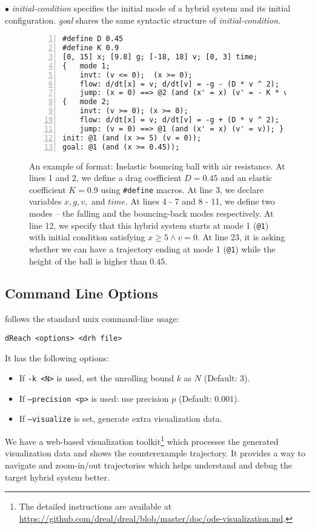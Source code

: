 $\bullet$ \textit{initial-condition} specifies the initial mode of a hybrid
system and its initial configuration. \textit{goal} shares the same
syntactic structure of \textit{initial-condition}.
\begin{figure}
  \centering
  \begin{Verbatim}[fontfamily=courier, frame=single, framesep=1mm,
  numbers=left, fontsize=\scriptsize]
#define D 0.45
#define K 0.9
[0, 15] x; [9.8] g; [-18, 18] v; [0, 3] time;
{   mode 1;
    invt: (v <= 0);  (x >= 0);
    flow: d/dt[x] = v; d/dt[v] = -g - (D * v ^ 2);
    jump: (x = 0) ==> @2 (and (x' = x) (v' = - K * v)); }
{   mode 2;
    invt: (v >= 0); (x >= 0);
    flow: d/dt[x] = v; d/dt[v] = -g + (D * v ^ 2);
    jump: (v = 0) ==> @1 (and (x' = x) (v' = v)); }
init: @1 (and (x >= 5) (v = 0));
goal: @1 (and (x >= 0.45));
\end{Verbatim}
\caption{An example of \drh{} format: Inelastic bouncing ball with air
  resistance. At lines 1 and 2, we define a drag coefficient $D = 0.45$
  and an elastic coefficient $K = 0.9$ using \texttt{\#define} macros.
  At line 3, we declare variables $x, g, v,$ and $time$. At lines
  4 - 7 and 8 - 11, we define two modes -- the falling and the
  bouncing-back modes respectively. At line 12, we specify
  that this hybrid system starts at mode 1 (\texttt{@1}) with initial
  condition satisfying $x \ge 5 \land v = 0$. At line 23, it
  is asking whether we can have a trajectory ending at mode 1
  (\texttt{@1}) while the height of the ball is higher than $0.45$.}
\label{fig:bouncing-ball-drh}
\end{figure}

\subsection{Command Line Options}
\dReach{} follows the standard unix command-line usage:
\begin{Verbatim}[fontfamily=courier, framesep=1mm, fontsize=\small]
dReach <options> <drh file>
\end{Verbatim}
It has the following options:
\begin{itemize}
\item If \texttt{-k <N>} is used, set the unrolling bound $k$ as $N$ (Default: 3).
\item If \texttt{--precision <p>} is used: use precision $p$ (Default: $0.001$).
\item If \texttt{--visualize} is set, \dReach{} generate extra visualization data.
\end{itemize}
We have a web-based visualization toolkit\footnote{The detailed
  instructions are available at
  \url{https://github.com/dreal/dreal/blob/master/doc/ode-visualization.md}.}
which processes the generated visualization data and shows the
counterexample trajectory. It provides a way to navigate and
zoom-in/out trajectories which helps understand and debug the target
hybrid system better.

